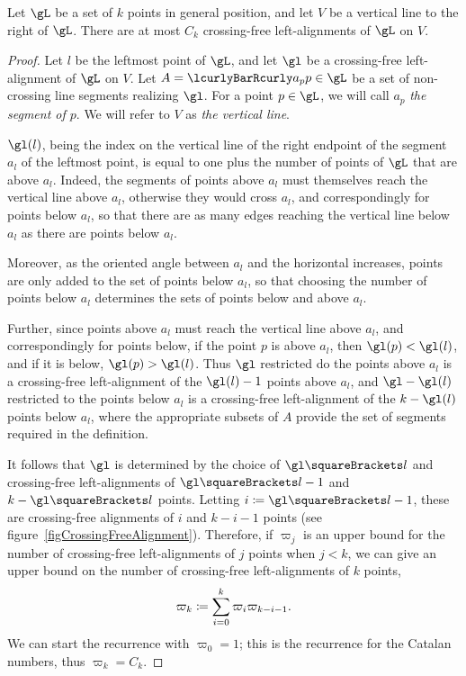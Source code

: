 \documentclass[10pt, a4paper, twoside]{basestyle}
\begin{document}
\begin{lemma}
Let $\gL$ be a set of $k$ points in general position, and let $V$ be a vertical line to the right of $\gL$.
There are at most $C_k$ crossing-free left-alignments of $\gL$ on $V$.
\begin{proof}
Let $l$ be the leftmost point of $\gL$, and let $\gl$ be a crossing-free left-alignment of $\gL$ on $V$.
Let $A=\setst{a_p}{p\in\gL}$ be a set of non-crossing line segments realizing $\gl$.
For a point $p\in\gL$, we will call $a_p$ \emph{the segment of $p$}. We will refer to $V$ as
\emph{the vertical line}.

$\gl(l)$, being the index on the vertical line of the right endpoint of the segment $a_l$ of the leftmost point,
is equal to one plus the number of points of $\gL$ that are above $a_l$. Indeed, the segments of points above $a_l$ must
themselves reach the vertical line above $a_l$, otherwise they would cross $a_l$, and correspondingly for
points below $a_l$, so that there are as many edges reaching the vertical line below $a_l$ as there are points
below $a_l$.

Moreover, as the oriented angle between $a_l$ and the horizontal increases, points are only added to the
set of points below $a_l$, so that choosing the number of points below $a_l$ determines the sets of points
below and above $a_l$.

Further, since points above $a_l$ must reach the vertical line above $a_l$, and correspondingly for points below,
if the point $p$ is above $a_l$, then $\gl(p) < \gl(l)$, and if it is below, $\gl(p) > \gl(l)$. Thus
$\gl$ restricted do the points above $a_l$ is a crossing-free left-alignment of the $\gl(l) - 1$ points above
$a_l$, and $\gl-\gl(l)$ restricted to the points below $a_l$ is a crossing-free left-alignment of the
$k - \gl(l)$ points below $a_l$, where the appropriate subsets of $A$ provide the set of segments required
in the definition.

It follows that $\gl$ is determined by the choice of $\gl\of l$ and crossing-free left-align\-ments
of $\gl\of{l}-1$ and $k-\gl\of{l}$ points.
Letting $i\DefineAs \gl\of l - 1$, these are crossing-free alignments of $i$ and $k-i-1$ points (see
figure~\ref{figCrossingFreeAlignment}).
Therefore, if $\varpi_j$ is an upper bound for the number of crossing-free
left-alignments of $j$ points when $j < k$,
we can give an upper bound on the number of crossing-free left-alignments of $k$ points,
\[\varpi_k\DefineAs\sum{i=0}[k]\varpi_{i}\varpi_{k-i-1}\text.\]
We can start the recurrence with $\varpi_0 = 1$; this is the recurrence for the Catalan numbers, thus
$\varpi_k=C_k$.
\end{proof}
\end{lemma}
\end{document}

